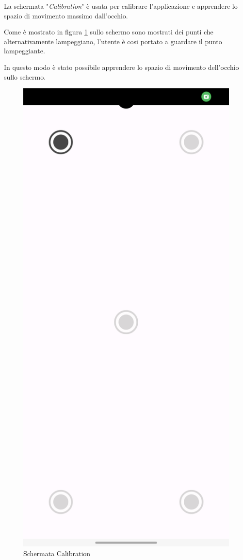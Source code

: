 La schermata "\textit{Calibration}" è usata per calibrare l'applicazione e apprendere lo spazio di movimento massimo dall'occhio.

Come è mostrato in figura \ref{fig:calibration} sullo schermo sono mostrati dei punti che alternativamente lampeggiano, l'utente è cosi portato a guardare il punto lampeggiante.

In questo modo è stato possibile apprendere lo spazio di movimento dell'occhio sullo schermo.

\begin{figure}[htbp]
    \centering
    \includegraphics[scale=0.12]{ProgettoAndroid/Calibration/Images/CameraApp_Screen_calibration.jpg}
    \caption{Schermata Calibration}
    \label{fig:calibration}
\end{figure}
